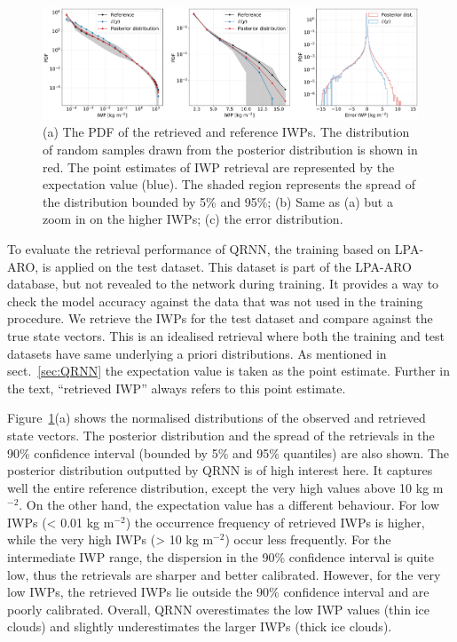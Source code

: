 \documentclass[amt, manuscript]{copernicus}
\begin{document}
\begin{figure}[t]
	\includegraphics[width=12cm]{Figures/PDF_IWP_ARO.pdf}
	\caption{(a) The PDF of the retrieved and reference IWPs. The distribution of random samples drawn from the posterior distribution is shown in red. The point estimates of IWP retrieval are represented by the expectation value (blue). The shaded region represents the spread of the distribution bounded by 5\% and 95\%; (b) Same as (a) but a zoom in on the higher IWPs; (c) the error distribution. }
	\label{fig:PDF_IWP_test}
\end{figure}

To evaluate the  retrieval performance of QRNN, the training based on LPA-ARO, is applied on the test dataset. This dataset is part of the LPA-ARO database, but not revealed to the network during training. It provides a way to check the model accuracy against the data that was not used in the training procedure. We retrieve the IWPs for the test dataset and compare against the true state vectors. This is an idealised retrieval where both the training and test datasets have same underlying a priori distributions. As mentioned in sect.~\ref{sec:QRNN} the expectation value is taken as the point estimate. Further in the text, ``retrieved IWP'' always refers to this point estimate.

Figure~\ref{fig:PDF_IWP_test}(a) shows the normalised distributions of the observed and retrieved state vectors. The posterior distribution and the spread of the retrievals in the 90\% confidence interval (bounded by 5\% and 95\% quantiles) are also shown. The posterior distribution outputted by QRNN is of high interest here. It captures well the entire reference distribution, except the very high values above 10\,\,kg m$^{-2}$.  On the other hand, the expectation value has a different behaviour. For low IWPs (< 0.01\,\,kg m$^{-2}$) the occurrence frequency of retrieved IWPs is higher, while the very high IWPs (> 10\,\,kg m$^{-2}$) occur less frequently. For the intermediate IWP range, the dispersion in the 90\% confidence interval is quite low, thus the retrievals are  sharper and better calibrated. However, for the very low IWPs, the retrieved IWPs lie outside the 90\% confidence interval and are poorly calibrated. Overall, QRNN overestimates the low IWP values (thin ice clouds) and  slightly underestimates the larger IWPs (thick ice clouds).
\end{document}
